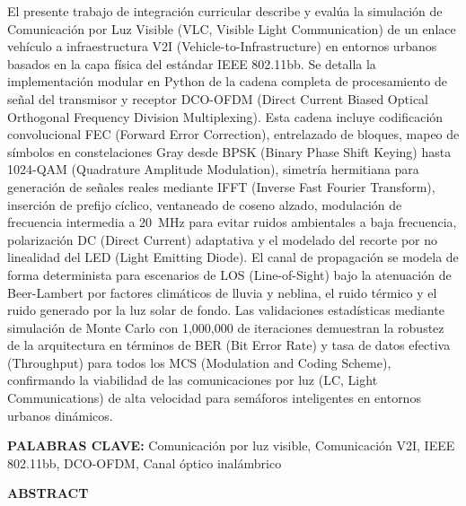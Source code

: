 \noindent El presente trabajo de integración curricular describe y evalúa la simulación de Comunicación por Luz Visible (VLC, Visible Light Communication) de un enlace vehículo a infraestructura V2I (Vehicle-to-Infrastructure) en entornos urbanos basados en la capa física del estándar IEEE 802.11bb. Se detalla la implementación modular en Python de la cadena completa de procesamiento de señal del transmisor y receptor DCO-OFDM (Direct Current Biased Optical Orthogonal Frequency Division Multiplexing). Esta cadena incluye codificación convolucional FEC (Forward Error Correction), entrelazado de bloques, mapeo de símbolos en constelaciones Gray desde BPSK (Binary Phase Shift Keying) hasta 1024-QAM (Quadrature Amplitude Modulation), simetría hermitiana para generación de señales reales mediante IFFT (Inverse Fast Fourier Transform), inserción de prefijo cíclico, ventaneado de coseno alzado, modulación de frecuencia intermedia a 20~MHz para evitar ruidos ambientales a baja frecuencia, polarización DC (Direct Current) adaptativa y el modelado del recorte por no linealidad del LED (Light Emitting Diode). El canal de propagación se modela de forma determinista para escenarios de LOS (Line-of-Sight) bajo la atenuación de Beer-Lambert por factores climáticos de lluvia y neblina, el ruido térmico y el ruido generado por la luz solar de fondo. Las validaciones estadísticas mediante simulación de Monte Carlo con 1,000,000 de iteraciones demuestran la robustez de la arquitectura en términos de BER (Bit Error Rate) y tasa de datos efectiva (Throughput) para todos los MCS (Modulation and Coding Scheme), confirmando la viabilidad de las comunicaciones por luz (LC, Light Communications) de alta velocidad para semáforos inteligentes en entornos urbanos dinámicos.

\vspace{1.0cm}
\noindent \textbf{PALABRAS CLAVE:} Comunicación por luz visible, Comunicación V2I, IEEE 802.11bb, DCO-OFDM, Canal óptico inalámbrico

\clearpage

\begin{center}
    {\fontsize{14}{17}\bfseries\sffamily ABSTRACT}
\end{center}
\vspace{0.5cm}

